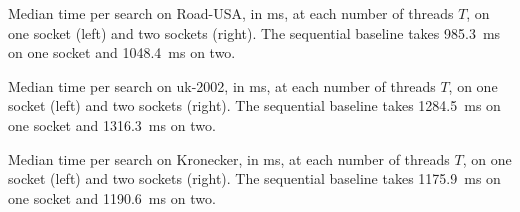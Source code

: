 \begin{table}
    \caption{Median time per search on Road-USA, in ms, at each number of threads $T$, on one socket (left) and two sockets (right). The sequential baseline takes 985.3~ms on one socket and 1048.4~ms on two.}
    \label{tab:app-road}
    \timestable{\dataOneRoad}{\dataTwoRoad}
\end{table}

\begin{table}
    \caption{Median time per search on uk-2002, in ms, at each number of threads $T$, on one socket (left) and two sockets (right). The sequential baseline takes 1284.5~ms on one socket and 1316.3~ms on two.}
    \label{tab:app-uk}
    \timestable{\dataOneUK}{\dataTwoUK}
\end{table}

\begin{table}
    \caption{Median time per search on Kronecker, in ms, at each number of threads $T$, on one socket (left) and two sockets (right). The sequential baseline takes 1175.9~ms on one socket and 1190.6~ms on two.}
    \label{tab:app-kron}
    \timestable{\dataOneKron}{\dataTwoKron}
\end{table}
